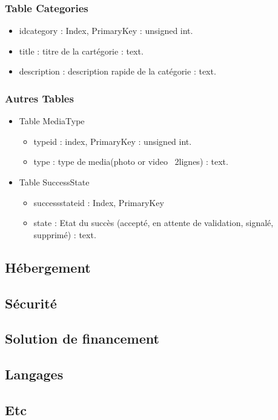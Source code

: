 \documentclass[a4paper,10pt]{article}
\begin{document}
\subsubsection{Table Categories}

\begin{itemize}
\item idcategory : Index, PrimaryKey : unsigned int.
\item title : titre de la cartégorie : text.
\item description : description rapide de la catégorie : text.
\end{itemize}

\subsubsection{Autres Tables}

\begin{itemize}
\item Table MediaType
\begin{itemize}
\item typeid : index, PrimaryKey : unsigned int.
\item type : type de media(photo or video ~2lignes) : text.
\end{itemize}
\item Table SuccessState
\begin{itemize}
\item successstateid : Index, PrimaryKey
\item state : Etat du succès (accepté, en attente de validation, signalé, supprimé) : text.
\end{itemize}
\end{itemize}

\subsection{Hébergement}
\subsection{Sécurité}
\subsection{Solution de financement}
\subsection{Langages}
\subsection{Etc}
\end{document}
